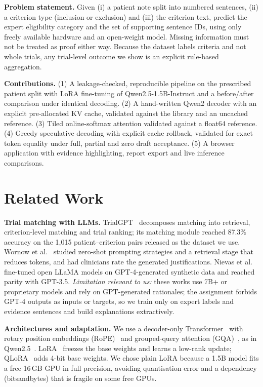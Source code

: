 \documentclass[conference]{IEEEtran}
\begin{document}
\textbf{Problem statement.} Given (i) a patient note split into numbered sentences, (ii) a criterion type (inclusion or exclusion) and (iii) the criterion text, predict the expert eligibility category and the set of supporting sentence IDs, using only freely available hardware and an open-weight model. Missing information must not be treated as proof either way. Because the dataset labels criteria and not whole trials, any trial-level outcome we show is an explicit rule-based aggregation.

\textbf{Contributions.} (1) A leakage-checked, reproducible pipeline on the prescribed patient split with LoRA fine-tuning of Qwen2.5-1.5B-Instruct and a before/after comparison under identical decoding. (2) A hand-written Qwen2 decoder with an explicit pre-allocated KV cache, validated against the library and an uncached reference. (3) Tiled online-softmax attention validated against a float64 reference. (4) Greedy speculative decoding with explicit cache rollback, validated for exact token equality under full, partial and zero draft acceptance. (5) A browser application with evidence highlighting, report export and live inference comparisons.

\section{Related Work}
\textbf{Trial matching with LLMs.} TrialGPT~\cite{jin2024trialgpt} decomposes matching into retrieval, criterion-level matching and trial ranking; its matching module reached 87.3\% accuracy on the 1{,}015 patient--criterion pairs released as the dataset we use. Wornow et al.~\cite{wornow2024zeroshot} studied zero-shot prompting strategies and a retrieval stage that reduces tokens, and had clinicians rate the generated justifications. Nievas et al.~\cite{nievas2024distilling} fine-tuned open LLaMA models on GPT-4-generated synthetic data and reached parity with GPT-3.5. \emph{Limitation relevant to us:} these works use 7B+ or proprietary models and rely on GPT-generated rationales; the assignment forbids GPT-4 outputs as inputs or targets, so we train only on expert labels and evidence sentences and build explanations extractively.

\textbf{Architectures and adaptation.} We use a decoder-only Transformer~\cite{vaswani2017attention} with rotary position embeddings (RoPE)~\cite{su2024roformer} and grouped-query attention (GQA)~\cite{ainslie2023gqa}, as in Qwen2.5~\cite{qwen2025qwen25}. LoRA~\cite{hu2022lora} freezes the base weights and learns a low-rank update; QLoRA~\cite{dettmers2023qlora} adds 4-bit base weights. We chose plain LoRA because a 1.5B model fits a free 16\,GB GPU in full precision, avoiding quantisation error and a dependency (bitsandbytes) that is fragile on some free GPUs.
\end{document}
